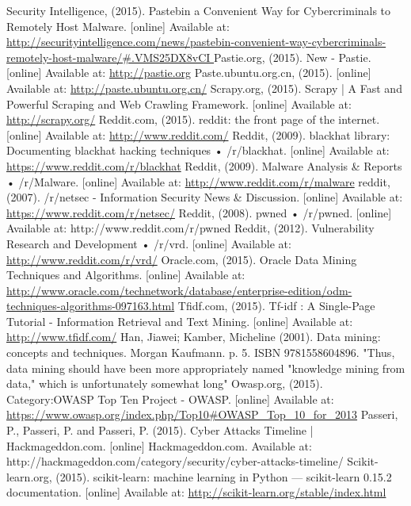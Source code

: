 \documentclass[12pt]{article}
\begin{document}
\begin{thebibliography}{99}
Security Intelligence, (2015). Pastebin a Convenient Way for Cybercriminals to Remotely Host Malware. [online] Available at: \url{http://securityintelligence.com/news/pastebin-convenient-way-cybercriminals-remotely-host-malware/#.VMS25DX8vCI }
Pastie.org, (2015). New - Pastie. [online] Available at: \url{http://pastie.org} 
 Paste.ubuntu.org.cn, (2015). [online] Available at: \url{http://paste.ubuntu.org.cn/}
Scrapy.org, (2015). Scrapy | A Fast and Powerful Scraping and Web Crawling Framework. [online] Available at: \url{http://scrapy.org/} 
Reddit.com, (2015). reddit: the front page of the internet. [online] Available at: \url{http://www.reddit.com/} 
Reddit, (2009). blackhat library: Documenting blackhat hacking techniques • /r/blackhat. [online] Available at: \url{https://www.reddit.com/r/blackhat}
Reddit, (2009). Malware Analysis \& Reports • /r/Malware. [online] Available at:   \url{http://www.reddit.com/r/malware}
reddit, (2007). /r/netsec - Information Security News \& Discussion. [online] Available at: \url{https://www.reddit.com/r/netsec/} 
Reddit, (2008). pwned • /r/pwned. [online] Available at: http://www.reddit.com/r/pwned 
Reddit, (2012). Vulnerability Research and Development • /r/vrd. [online] Available at: \url{http://www.reddit.com/r/vrd/}
Oracle.com, (2015). Oracle Data Mining Techniques and Algorithms. [online] Available at: \url{http://www.oracle.com/technetwork/database/enterprise-edition/odm-techniques-algorithms-097163.html}
Tfidf.com, (2015). Tf-idf : A Single-Page Tutorial - Information Retrieval and Text Mining. [online] Available at: \url{http://www.tfidf.com/} 
Han, Jiawei; Kamber, Micheline (2001). Data mining: concepts and techniques. Morgan Kaufmann. p. 5. ISBN 9781558604896. "Thus, data mining should have been more appropriately named "knowledge mining from data," which is unfortunately somewhat long"
Owasp.org, (2015). Category:OWASP Top Ten Project - OWASP. [online] Available at: \url{https://www.owasp.org/index.php/Top10#OWASP_Top_10_for_2013} 
Passeri, P., Passeri, P. and Passeri, P. (2015). Cyber Attacks Timeline | Hackmageddon.com. [online] Hackmageddon.com. Available at: http://hackmageddon.com/category/security/cyber-attacks-timeline/ 
Scikit-learn.org, (2015). scikit-learn: machine learning in Python — scikit-learn 0.15.2 documentation. [online] Available at: \url{http://scikit-learn.org/stable/index.html}

\end{thebibliography}
\end{document}
